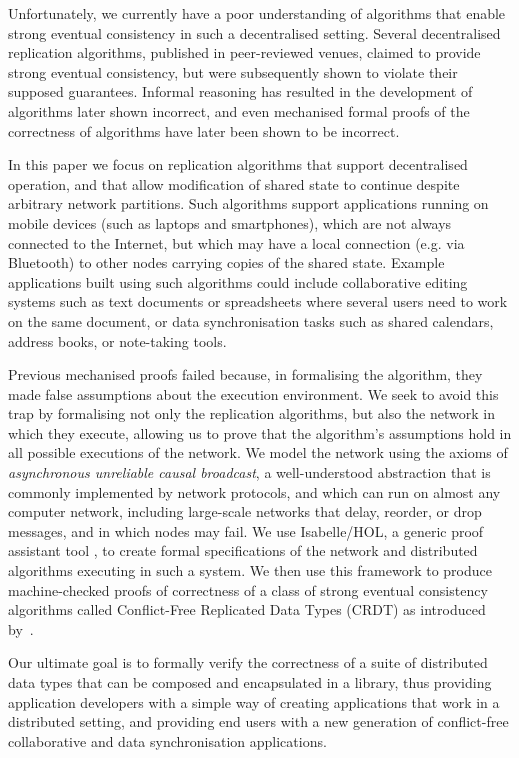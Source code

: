 \documentclass[acmlarge,review,anonymous]{acmart}\settopmatter{printfolios=true}
\begin{document}
Unfortunately, we currently have a poor understanding of algorithms that enable strong eventual consistency in such a decentralised setting.
Several decentralised replication algorithms, published in peer-reviewed venues, claimed to provide strong eventual consistency, but were subsequently shown to violate their supposed guarantees.
Informal reasoning has resulted in the development of algorithms later shown incorrect, and even mechanised formal proofs of the correctness of algorithms have later been shown to be incorrect.

In this paper we focus on replication algorithms that support decentralised operation, and that allow modification of shared state to continue despite arbitrary network partitions.
Such algorithms support applications running on mobile devices (such as laptops and smartphones), which are not always connected to the Internet, but which may have a local connection (e.g. via Bluetooth) to other nodes carrying copies of the shared state.
Example applications built using such algorithms could include collaborative editing systems such as text documents or spreadsheets where several users need to work on the same document, or data synchronisation tasks such as shared calendars, address books, or note-taking tools.

Previous mechanised proofs failed because, in formalising the algorithm, they made false assumptions about the execution environment.
We seek to avoid this trap by formalising not only the replication algorithms, but also the network in which they execute, allowing us to prove that the algorithm's assumptions hold in all possible executions of the network.
We model the network using the axioms of \emph{asynchronous unreliable causal broadcast}, a well-understood abstraction that is commonly implemented by network protocols, and which can run on almost any computer network, including large-scale networks that delay, reorder, or drop messages, and in which nodes may fail.
We use Isabelle/HOL, a generic proof assistant tool \cite{DBLP:conf/tphol/WenzelPN08}, to create formal specifications of the network and distributed algorithms executing in such a system. 
We then use this framework to produce machine-checked proofs of correctness of a class of strong eventual consistency algorithms called Conflict-Free Replicated Data Types (CRDT) as introduced by~\citet{Shapiro:2011wy,Shapiro:2011un}. 

Our ultimate goal is to formally verify the correctness of a suite of distributed data types that can be composed and encapsulated in a library, thus providing application developers with a simple way of creating applications that work in a distributed setting, and providing end users with a new generation of conflict-free collaborative and data synchronisation applications.
\end{document}
